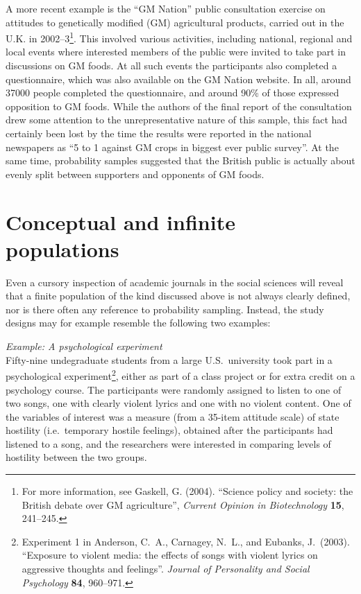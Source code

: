 A more recent example is the ``GM Nation'' public
consultation exercise on attitudes to genetically modified (GM)
agricultural products, carried out in the U.K. in 2002--3\footnote{For
more information, see Gaskell, G. (2004). ``Science policy and society:
the British debate over GM agriculture'', \emph{Current Opinion in
Biotechnology} \textbf{15}, 241--245.}. This involved various
activities, including national, regional and local events where
interested members of the public were invited to take part in
discussions on GM foods. At all such events the participants also
completed a questionnaire, which was also available on the GM Nation
website. In all, around 37000 people completed the questionnaire, and
around 90\% of those expressed opposition to GM foods. While the authors
of the final report of the consultation drew some attention to the
unrepresentative nature of this sample, this fact had certainly been
lost by the time the results were reported in the national newspapers as
``5 to 1 against GM crops in biggest ever public
survey''. At the same time, probability samples suggested that the
British public is actually about evenly split between supporters and
opponents of GM foods.

\section{Conceptual and infinite populations}
\label{s_samples_infpops}

Even a cursory inspection of academic journals in the social sciences
will reveal that a finite population of the kind discussed above is not
always clearly defined, nor is there often any reference to probability
sampling. Instead, the study designs may for example resemble the
following two examples:

\emph{Example: A psychological experiment}\\
Fifty-nine undegraduate students from a large U.S.\ university took part
in a psychological experiment\footnote{Experiment 1 in Anderson, C.\ A.,
Carnagey, N.\ L., and Eubanks, J.\ (2003). ``Exposure to violent media:
the effects of songs with violent lyrics on aggressive thoughts and
feelings''. \emph{Journal of Personality and Social Psychology}
\textbf{84}, 960--971.}, either as part of a class project or for extra
credit on a psychology course. The participants were randomly assigned
to listen to one of two songs, one with clearly violent lyrics and one
with no violent content. One of the variables of interest was a measure
(from a 35-item attitude scale) of state hostility (i.e.\ temporary
hostile feelings), obtained after the participants had listened to a
song, and the researchers were interested in comparing levels of
hostility between the two groups.

